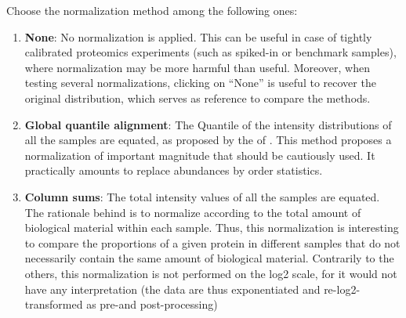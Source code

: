 \documentclass[12pt]{article}
\begin{document}
Choose the normalization method among the following ones:
\begin{enumerate}
	\item \textbf{None}: No normalization is applied. This can be useful in case of tightly calibrated proteomics experiments (such as spiked-in or benchmark samples), where normalization may be more harmful than useful. Moreover, when testing several normalizations, clicking on ``None'' is useful to recover the original distribution, which serves as reference to compare the methods.
	\item \textbf{Global quantile alignment}: The Quantile of the intensity distributions of all the samples are equated, as proposed by the  of . This method proposes a normalization of important
magnitude that should be cautiously used. It practically amounts to replace 
abundances by order statistics. 
	\item \textbf{Column sums}: The total intensity values of all the samples are equated. The rationale behind is to normalize according to the total amount of biological material within each sample. Thus, this normalization is interesting to compare the proportions of a given 
     protein in different samples that do not necessarily contain the same 
     amount of biological material. Contrarily to the others, this 
     normalization is not performed on the log2 scale, for it would not have 
     any interpretation (the data are thus exponentiated and 
     re-log2-transformed as pre-and post-processing)
	

\end{enumerate}
\end{document}
